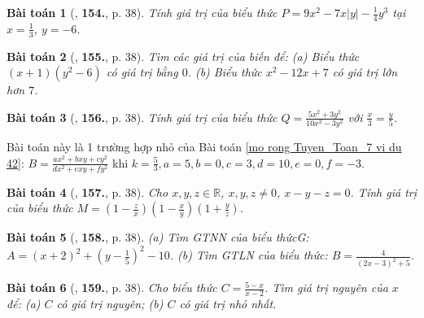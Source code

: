 \documentclass{article}
\numberwithin{equation}{section}
\newtheorem{baitoan}{Bài toán}
\begin{document}
\begin{baitoan}[\cite{Tuyen_Toan_7}, \textbf{154.}, p. 38]
	Tính giá trị của biểu thức $P = 9x^2 - 7x|y| - \frac{1}{4}y^3$ tại $x = \frac{1}{3}$, $y = -6$.
\end{baitoan}

\begin{baitoan}[\cite{Tuyen_Toan_7}, \textbf{155.}, p. 38]
	Tìm các giá trị của biến để: (a) Biểu thức $(x + 1)(y^2 - 6)$ có giá trị bằng $0$. (b) Biểu thức $x^2 - 12x + 7$ có giá trị lớn hơn $7$.
\end{baitoan}

\begin{baitoan}[\cite{Tuyen_Toan_7}, \textbf{156.}, p. 38]
	Tính giá trị của biểu thức $Q = \frac{5x^2 + 3y^2}{10x^2 - 3y^2}$ với $\frac{x}{3} = \frac{y}{5}$.
\end{baitoan}
Bài toán này là 1 trường hợp nhỏ của Bài toán \ref{mo rong Tuyen_Toan_7 vi du 42}: $B = \frac{ax^2 + bxy + cy^2}{dx^2 + exy + fy^2}$ khi $k = \frac{5}{3}, a = 5, b = 0, c = 3, d = 10, e = 0, f = -3$.

\begin{baitoan}[\cite{Tuyen_Toan_7}, \textbf{157.}, p. 38]
	Cho $x,y,z\in\mathbb{R}$, $x,y,z\ne0$, $x - y - z = 0$. Tính giá trị của biểu thức $M = \left(1 - \frac{z}{x}\right)\left(1 - \frac{x}{y}\right)\left(1 + \frac{y}{z}\right)$.
\end{baitoan}

\begin{baitoan}[\cite{Tuyen_Toan_7}, \textbf{158.}, p. 38]
	(a) Tìm GTNN của biểu thứcG: $A = (x + 2)^2 + \left(y - \frac{1}{5}\right)^2 - 10$. (b) Tìm GTLN của biểu thức: $B = \frac{4}{(2x - 3)^2 + 5}$.
\end{baitoan}

\begin{baitoan}[\cite{Tuyen_Toan_7}, \textbf{159.}, p. 38]
	Cho biểu thức $C = \frac{5 - x}{x - 2}$. Tìm giá trị nguyên của $x$ để: (a) $C$ có giá trị nguyên; (b) $C$ có giá trị nhỏ nhất.
\end{baitoan}

\end{document}

